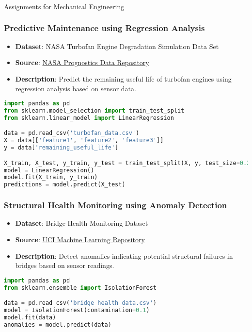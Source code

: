 \begin{frame}[fragile]\frametitle{}
\begin{center}
{\Large Assignments for Mechanical Engineering}
\end{center}
\end{frame}

\begin{frame}[fragile]\frametitle{Predictive Maintenance using Regression Analysis}
    \begin{itemize}
        \item \textbf{Dataset}: NASA Turbofan Engine Degradation Simulation Data Set
        \item \textbf{Source}: \href{https://www.nasa.gov/content/prognostics-center-of-excellence-data-set-repository}{NASA Prognostics Data Repository}
        \item \textbf{Description}: Predict the remaining useful life of turbofan engines using regression analysis based on sensor data.
    \end{itemize}
    \begin{lstlisting}[language=Python]
import pandas as pd
from sklearn.model_selection import train_test_split
from sklearn.linear_model import LinearRegression

data = pd.read_csv('turbofan_data.csv')
X = data[['feature1', 'feature2', 'feature3']]
y = data['remaining_useful_life']

X_train, X_test, y_train, y_test = train_test_split(X, y, test_size=0.2)
model = LinearRegression()
model.fit(X_train, y_train)
predictions = model.predict(X_test)
    \end{lstlisting}
\end{frame}

\begin{frame}[fragile]\frametitle{Structural Health Monitoring using Anomaly Detection}
    \begin{itemize}
        \item \textbf{Dataset}: Bridge Health Monitoring Dataset
        \item \textbf{Source}: \href{https://archive.ics.uci.edu/ml/datasets/Bridge+Health+Monitoring}{UCI Machine Learning Repository}
        \item \textbf{Description}: Detect anomalies indicating potential structural failures in bridges based on sensor readings.
    \end{itemize}
    \begin{lstlisting}[language=Python]
import pandas as pd
from sklearn.ensemble import IsolationForest

data = pd.read_csv('bridge_health_data.csv')
model = IsolationForest(contamination=0.1)
model.fit(data)
anomalies = model.predict(data)
    \end{lstlisting}
\end{frame}

